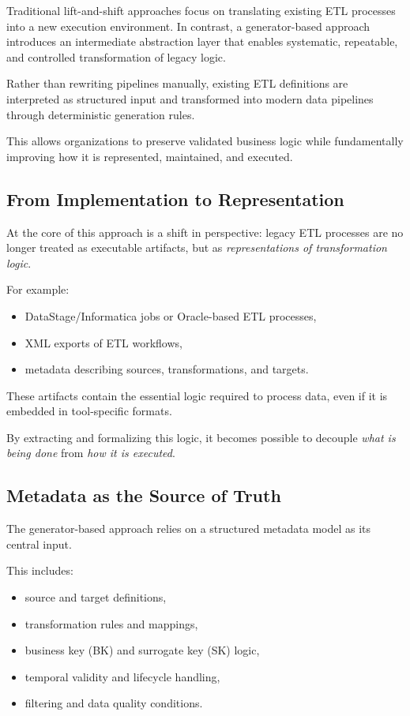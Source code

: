 \documentclass[11pt,a4paper]{article}
\begin{document}
Traditional lift-and-shift approaches focus on translating existing ETL processes into a new execution environment. In contrast, a generator-based approach introduces an intermediate abstraction layer that enables systematic, repeatable, and controlled transformation of legacy logic.

Rather than rewriting pipelines manually, existing ETL definitions are interpreted as structured input and transformed into modern data pipelines through deterministic generation rules.

This allows organizations to preserve validated business logic while fundamentally improving how it is represented, maintained, and executed.

\subsection{From Implementation to Representation}

At the core of this approach is a shift in perspective: legacy ETL processes are no longer treated as executable artifacts, but as \emph{representations of transformation logic}.

For example:
\begin{itemize}
  \item DataStage/Informatica jobs or Oracle-based ETL processes,
  \item XML exports of ETL workflows,
  \item metadata describing sources, transformations, and targets.
\end{itemize}

These artifacts contain the essential logic required to process data, even if it is embedded in tool-specific formats.

By extracting and formalizing this logic, it becomes possible to decouple \emph{what is being done} from \emph{how it is executed}.

\subsection{Metadata as the Source of Truth}

The generator-based approach relies on a structured metadata model as its central input.

This includes:
\begin{itemize}
  \item source and target definitions,
  \item transformation rules and mappings,
  \item business key (BK) and surrogate key (SK) logic,
  \item temporal validity and lifecycle handling,
  \item filtering and data quality conditions.
\end{itemize}
\end{document}
